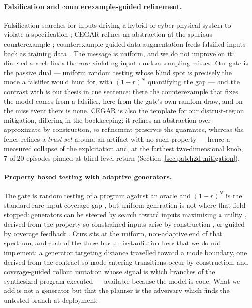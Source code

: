 \paragraph{Falsification and counterexample-guided refinement.} Falsification searches for inputs driving a hybrid or cyber-physical system to violate a specification \citep{annpureddy2011staliro,corso2021survey,yamagata2021falsification}; CEGAR refines an abstraction at the spurious counterexample \citep{clarke2000cegar,clarke2003hybridcegar,alur2006predicate}; counterexample-guided data augmentation feeds falsified inputs back as training data \citep{dreossi2018cegda,dreossi2019verifai}. The message is uniform, and we do not improve on it: directed search finds the rare violating input random sampling misses. Our gate is the passive dual --- uniform random testing whose blind spot is precisely the mode a falsifier would hunt for, with $(1-r)^N$ quantifying the gap --- and the contrast with \citet{dreossi2018cegda} is our thesis in one sentence: there the counterexample that fixes the model comes from a falsifier, here from the gate's own random draw, and on the miss event there is none. CEGAR is also the template for our distrust-region mitigation, differing in the bookkeeping: it refines an abstraction over-approximate by construction, so refinement preserves the guarantee, whereas the fence refines a \emph{trust set} around an artifact with no such property --- hence a measured collapse of the exploitation and, at the farthest two-dimensional knob, $7$ of $20$ episodes pinned at blind-level return (Section~\ref{sec:patch2d-mitigation}).

\paragraph{Property-based testing with adaptive generators.} The gate is random testing of a program against an oracle and $(1-r)^N$ is the standard rare-input coverage gap \citep{claessen2000quickcheck,rubinstein2017montecarlo}, but uniform generation is not where that field stopped: generators can be steered by search toward inputs maximizing a utility \citep{loscher2017targeted,loscher2018automating}, derived from the property so constrained inputs arise by construction \citep{lampropoulos2017luck}, or guided by coverage feedback \citep{padhye2019zest}. Ours sits at the uniform, non-adaptive end of that spectrum, and each of the three has an instantiation here that we do not implement: a generator targeting distance travelled toward a mode boundary, one derived from the contract so mode-entering transitions occur by construction, and coverage-guided rollout mutation whose signal is which branches of the synthesized program executed --- available because the model is code. What we add is not a generator but that the planner is the adversary which finds the untested branch at deployment.

